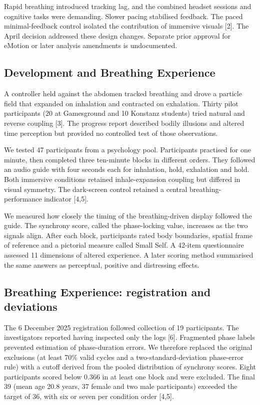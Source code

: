 Rapid breathing introduced tracking lag, and the combined headset sessions and cognitive tasks were demanding. Slower pacing stabilised feedback. The paced minimal-feedback control isolated the contribution of immersive visuals [2]. The April decision addressed these design changes. Separate prior approval for eMotion or later analysis amendments is undocumented.

\subsection{Development and Breathing Experience}
\label{sec:subjective-methods}
A controller held against the abdomen tracked breathing and drove a particle field that expanded on inhalation and contracted on exhalation. Thirty pilot participants (20 at Gamesground and 10 Konstanz students) tried natural and reverse coupling [3]. The progress report described bodily illusions and altered time perception but provided no controlled test of those observations.

We tested 47 participants from a psychology pool. Participants practised for one minute, then completed three ten-minute blocks in different orders. They followed an audio guide with four seconds each for inhalation, hold, exhalation and hold. Both immersive conditions retained inhale-expansion coupling but differed in visual symmetry. The dark-screen control retained a central breathing-performance indicator [4,5].

We measured how closely the timing of the breathing-driven display followed the guide. The synchrony score, called the phase-locking value, increases as the two signals align. After each block, participants rated body boundaries, spatial frame of reference and a pictorial measure called Small Self. A 42-item questionnaire assessed 11 dimensions of altered experience. A later scoring method summarised the same answers as perceptual, positive and distressing effects.

\subsection{Breathing Experience: registration and deviations}
The 6 December 2025 registration followed collection of 19 participants. The investigators reported having inspected only the logs [6]. Fragmented phase labels prevented estimation of phase-duration errors. We therefore replaced the original exclusions (at least 70\% valid cycles and a two-standard-deviation phase-error rule) with a cutoff derived from the pooled distribution of synchrony scores. Eight participants scored below 0.366 in at least one block and were excluded. The final 39 (mean age 20.8 years, 37 female and two male participants) exceeded the target of 36, with six or seven per condition order [4,5].

